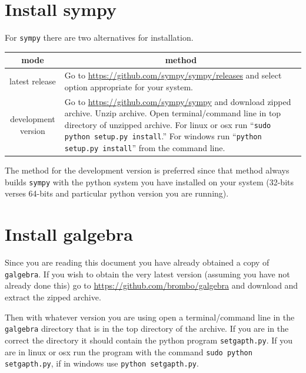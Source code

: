 \documentclass[12pt]{report}
\newcommand{\T}[1]{\texttt{#1}}
\begin{document}
\section{Install sympy}
For \T{sympy} there are two alternatives for installation.
\begin{center}
\begin{tabular}{cl}
 mode & \multicolumn{1}{c}{method} \vspace{5pt} \\ \hline
 latest release & \parbox{4in}{\vspace{5pt}Go to \url{https://github.com/sympy/sympy/releases} and select
                               option appropriate for your system.\vspace{5pt}} \\ \hline
 development version & \parbox{4in}{\vspace{5pt}Go to \url{https://github.com/sympy/sympy} and download zipped archive.
                                    Unzip archive.  Open terminal/command line in top directory of unzipped
                                    archive. For linux or osx run ``\T{sudo python setup.py install}.'' For windows run
                                    ``\T{python setup.py install}'' from the command line.\vspace{5pt}} \\ \hline
\end{tabular}
\end{center}
The method for the development version is preferred since that method always builds \T{sympy} with the python system you have
installed on your system (32-bits verses 64-bits and particular python version you are running).
\section{Install galgebra}
Since you are reading this document you have already obtained a copy of \T{galgebra}.  If you wish to obtain the very latest
version (assuming you have not already done this) go to \url{https://github.com/brombo/galgebra} and download and extract the
zipped archive.

Then with whatever version you are using open a terminal/command line in the \T{galgebra} directory that is in the top directory
of the archive.  If you are in the correct the directory it should contain the python program \T{setgapth.py}.  If you are in
linux or osx run the program with the command \T{sudo python setgapth.py}, if in windows use \T{python setgapth.py}.
\end{document}
